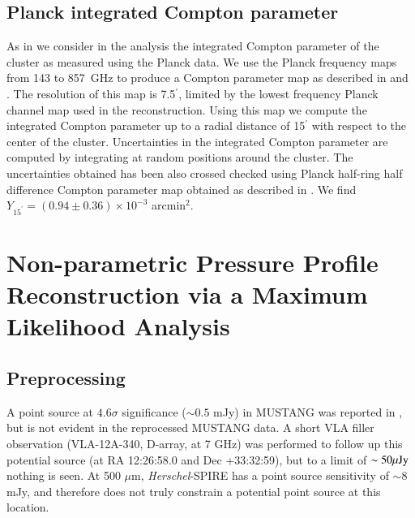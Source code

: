 \documentclass[twocolumn,traditabstract]{aa}
\begin{document}

\subsection{Planck integrated Compton parameter}
\label{sec:picp}

As in \citet{adam2015} we consider in the analysis the integrated Compton parameter of the cluster as measured using the Planck data.
We use the Planck frequency maps from 143 to 857~GHz to produce a Compton parameter map as described in \citet{hurier2013} and
\citet{planck2013ymap,planck2016_tsz}. The resolution of this map is 7.5$^{\prime}$, limited by the lowest frequency Planck channel
map used in the reconstruction. Using this map we compute the integrated Compton parameter up to a radial distance of 15$^{\prime}$ with
respect to the center of the cluster. Uncertainties in the integrated Compton parameter are computed by integrating at random positions
around the cluster. The uncertainties obtained has been also crossed checked using Planck half-ring half difference Compton parameter
map
obtained as described in \citet{planck2013ymap,planck2016_tsz}. We find $Y_{15^{\prime}} = (0.94 \pm 0.36) \times 10^{-3}$ arcmin$^2$. 


\section{Non-parametric Pressure Profile Reconstruction via a Maximum Likelihood Analysis}
\label{sec:ml_deproj}


\subsection{Preprocessing}
\label{sec:preprocessing}


A point source at $4.6\sigma$ significance ($\sim 0.5$ mJy) in MUSTANG was reported in \citet{korngut2011}, but is not
evident in the reprocessed MUSTANG data. A short VLA filler observation (VLA-12A-340, D-array, at 7 GHz) was performed
to follow up this potential source (at RA 12:26:58.0 and Dec +33:32:59), but to a limit of $\sim 50 {\rm \mu Jy}$ nothing
is seen. At 500 $\mu$m, \emph{Herschel}-SPIRE has a point source sensitivity of $\sim 8$ mJy, and therefore does not truly
constrain a potential point source at this location.
\end{document}
